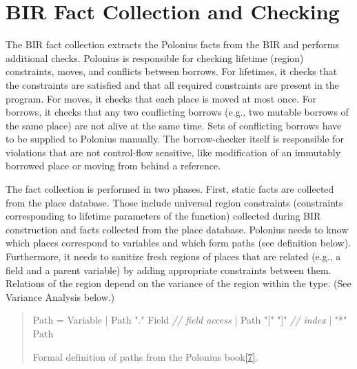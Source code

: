 \documentclass[
  11pt,
  twoside,symmetric]{report}
\newenvironment{Shaded}{}{}
\newcommand{\CommentTok}[1]{\textit{#1}}
\newcommand{\NormalTok}[1]{#1}
\newcommand{\OperatorTok}[1]{#1}
\newcommand{\StringTok}[1]{#1}
\begin{document}
\hypertarget{bir-fact-collection-and-checking}{%
\section{BIR Fact Collection and
Checking}\label{bir-fact-collection-and-checking}}

The BIR fact collection extracts the Polonius facts from the BIR and
performs additional checks. Polonius is responsible for checking
lifetime (region) constraints, moves, and conflicts between borrows. For
lifetimes, it checks that the constraints are satisfied and that all
required constraints are present in the program. For moves, it checks
that each place is moved at most once. For borrows, it checks that any
two conflicting borrows (e.g., two mutable borrows of the same place)
are not alive at the same time. Sets of conflicting borrows have to be
supplied to Polonius manually. The borrow-checker itself is responsible
for violations that are not control-flow sensitive, like modification of
an immutably borrowed place or moving from behind a reference.

The fact collection is performed in two phases. First, static facts are
collected from the place database. Those include universal region
constraints (constraints corresponding to lifetime parameters of the
function) collected during BIR construction and facts collected from the
place database. Polonius needs to know which places correspond to
variables and which form paths (see definition below). Furthermore, it
needs to sanitize fresh regions of places that are related (e.g., a
field and a parent variable) by adding appropriate constraints between
them. Relations of the region depend on the variance of the region
within the type. (See Variance Analysis below.)

\begin{quote}
\begin{Shaded}
\begin{Highlighting}[]
\NormalTok{Path }\OperatorTok{=}\NormalTok{ Variable}
     \OperatorTok{|}\NormalTok{ Path }\StringTok{"."}\NormalTok{ Field }\CommentTok{// field access}
     \OperatorTok{|}\NormalTok{ Path }\StringTok{"["} \StringTok{"]"}   \CommentTok{// index}
     \OperatorTok{|} \StringTok{"*"}\NormalTok{ Path}
\end{Highlighting}
\end{Shaded}

Formal definition of paths from the Polonius
book\protect\hyperlink{ref-polonius}{{[}7{]}}.
\end{quote}
\end{document}
